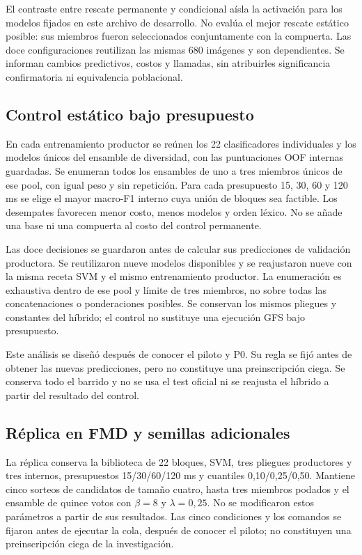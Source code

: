 El contraste entre rescate permanente y condicional aísla la activación para los modelos fijados en este archivo de desarrollo. No evalúa el mejor rescate estático posible: sus miembros fueron seleccionados conjuntamente con la compuerta. Las doce configuraciones reutilizan las mismas 680 imágenes y son dependientes. Se informan cambios predictivos, costos y llamadas, sin atribuirles significancia confirmatoria ni equivalencia poblacional.

\subsection{Control estático bajo presupuesto}\label{sec:diseno-estatico-presupuesto}
En cada entrenamiento productor se reúnen los 22 clasificadores individuales y los modelos únicos del ensamble de diversidad, con las puntuaciones OOF internas guardadas. Se enumeran todos los ensambles de uno a tres miembros únicos de ese pool, con igual peso y sin repetición. Para cada presupuesto 15, 30, 60 y 120 ms se elige el mayor macro-F1 interno cuya unión de bloques sea factible. Los desempates favorecen menor costo, menos modelos y orden léxico. No se añade una base ni una compuerta al costo del control permanente.

Las doce decisiones se guardaron antes de calcular sus predicciones de validación productora. Se reutilizaron nueve modelos disponibles y se reajustaron nueve con la misma receta SVM y el mismo entrenamiento productor. La enumeración es exhaustiva dentro de ese pool y límite de tres miembros, no sobre todas las concatenaciones o ponderaciones posibles. Se conservan los mismos pliegues y constantes del híbrido; el control no sustituye una ejecución GFS bajo presupuesto.

Este análisis se diseñó después de conocer el piloto y P0. Su regla se fijó antes de obtener las nuevas predicciones, pero no constituye una preinscripción ciega. Se conserva todo el barrido y no se usa el test oficial ni se reajusta el híbrido a partir del resultado del control.

\subsection{Réplica en FMD y semillas adicionales}\label{sec:diseno-replica}
La réplica conserva la biblioteca de 22 bloques, SVM, tres pliegues productores y tres internos, presupuestos 15/30/60/120 ms y cuantiles 0,10/0,25/0,50. Mantiene cinco sorteos de candidatos de tamaño cuatro, hasta tres miembros podados y el ensamble de quince votos con $\beta=8$ y $\lambda=0{,}25$. No se modificaron estos parámetros a partir de sus resultados. Las cinco condiciones y los comandos se fijaron antes de ejecutar la cola, después de conocer el piloto; no constituyen una preinscripción ciega de la investigación.

